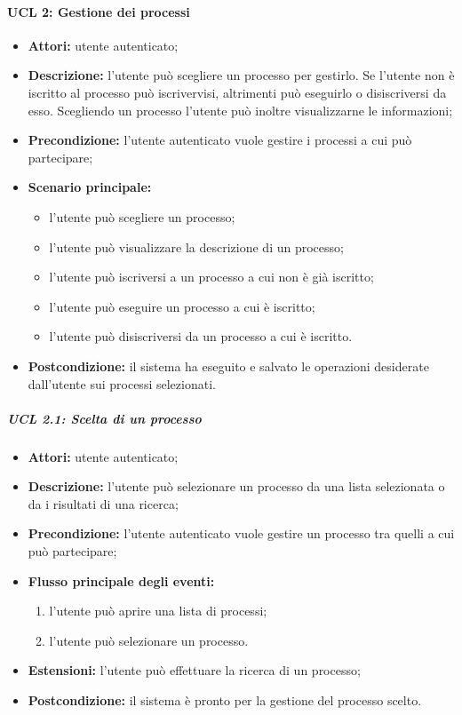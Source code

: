 \paragraph{UCL 2: Gestione dei processi}
\begin{itemize}
\item \textbf{Attori:} utente autenticato;
\item \textbf{Descrizione:} l'utente può scegliere un processo per gestirlo.
Se l'utente non è iscritto al processo può iscrivervisi, altrimenti può eseguirlo o disiscriversi da esso.
Scegliendo un processo l'utente può inoltre visualizzarne le informazioni;
\item \textbf{Precondizione:} l'utente autenticato vuole gestire i processi a cui può partecipare;
\item \textbf{Scenario principale:}
\begin{itemize}
\item l'utente può scegliere un processo;
\item l'utente può visualizzare la descrizione di un processo;
\item l'utente può iscriversi a un processo a cui non è già iscritto;
\item l'utente può eseguire un processo a cui è iscritto;
\item l'utente può disiscriversi da un processo a cui è iscritto.
\end{itemize}
\item \textbf{Postcondizione:} il sistema ha eseguito e salvato le operazioni desiderate dall'utente sui processi selezionati.
\end{itemize}

\subparagraph{UCL 2.1: Scelta di un processo}
\begin{itemize}
\item \textbf{Attori:} utente autenticato;
\item \textbf{Descrizione:} l'utente può selezionare un processo da una lista selezionata o da i risultati di una ricerca;
\item \textbf{Precondizione:} l'utente autenticato vuole gestire un processo tra quelli a cui può partecipare;
\item \textbf{Flusso principale degli eventi:}
\begin{enumerate}
\item l'utente può aprire una lista di processi;
\item l'utente può selezionare un processo.
\end{enumerate}
\item \textbf{Estensioni:} l'utente può effettuare la ricerca di un processo;
\item \textbf{Postcondizione:} il sistema è pronto per la gestione del processo scelto.
\end{itemize}

